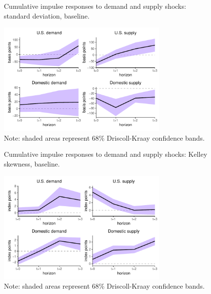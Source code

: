 \documentclass[12pt, a4paper]{article}
\begin{document}
\begin{figure}[H]
    \centering    
    \caption{Cumulative impulse responses to demand and supply shocks: standard deviation, baseline.}  
    \label{fig:std_base}
    \includegraphics[width=0.75\textwidth]{Figures/std_demand_supply_LP.pdf}
    \centering \caption*{Note: shaded areas represent 68\% Driscoll-Kraay confidence bands.}
\end{figure}

\begin{figure}[H]
    \centering    
    \caption{Cumulative impulse responses to demand and supply shocks: Kelley skewness, baseline.}  
    \label{fig:kelley_base}
    \includegraphics[width=0.75\textwidth]{Figures/kelley_demand_supply_LP.pdf}
    \centering \caption*{Note: shaded areas represent 68\% Driscoll-Kraay confidence bands.}
\end{figure}


\end{document}
